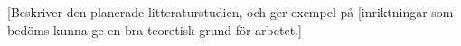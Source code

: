 [Beskriver den planerade litteraturstudien, och ger exempel på
[inriktningar som bedöms kunna ge en bra teoretisk grund för arbetet.]
